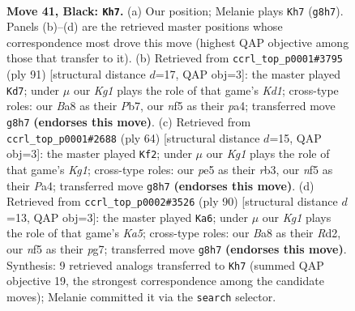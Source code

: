 \documentclass[11pt]{article}
\begin{document}
\clearpage

\begin{figure}[p]\centering
\begin{subfigure}{0.46\textwidth}\centering
\resizebox{\linewidth}{!}{%
\newchessgame
\chessboard[
  setfen={b5k1/P4p2/8/4PN1K/5p2/R6P/1r6/8 b - - 1 41},
  showmover=false,
  pgfstyle=straightmove, color=movearrow, markmove={g8-h7}
]}
\caption{}
\end{subfigure}\hfill
\begin{subfigure}{0.46\textwidth}\centering
\resizebox{\linewidth}{!}{%
\newchessgame
\chessboard[
  setfen={3k3K/1pp5/p7/4R2P/P7/8/8/6r1 b - - 17 46},
  showmover=false,
  pgfstyle=straightmove, color=movearrow, markmove={d8-d7}
]}
\caption{}
\end{subfigure}
\\[4pt]
\begin{subfigure}{0.46\textwidth}\centering
\resizebox{\linewidth}{!}{%
\newchessgame
\chessboard[
  setfen={6k1/pp6/7p/5R1P/P7/1r6/6P1/6K1 w - - 2 33},
  showmover=false,
  pgfstyle=straightmove, color=movearrow, markmove={g1-f2}
]}
\caption{}
\end{subfigure}\hfill
\begin{subfigure}{0.46\textwidth}\centering
\resizebox{\linewidth}{!}{%
\newchessgame
\chessboard[
  setfen={2k5/5ppp/8/KP4P1/7r/8/3R4/8 w - - 2 46},
  showmover=false,
  pgfstyle=straightmove, color=movearrow, markmove={a5-a6}
]}
\caption{}
\end{subfigure}
\caption{\textbf{Move 41, Black: \texttt{Kh7}.} (a) Our position; Melanie plays \texttt{Kh7} (\texttt{g8h7}). Panels (b)--(d) are the retrieved master positions whose correspondence most drove this move (highest QAP objective among those that transfer to it). (b) Retrieved from \texttt{ccrl\_top\_p0001\#3795} (ply 91) [structural distance $d$=17, QAP obj=3]: the master played \texttt{Kd7}; under $\mu$ our \emph{Kg1} plays the role of that game's \emph{Kd1}; cross-type roles: our \emph{B}a8 as their \emph{P}b7, our \emph{n}f5 as their \emph{p}a4; transferred move \texttt{g8h7} \textbf{(endorses this move)}. (c) Retrieved from \texttt{ccrl\_top\_p0001\#2688} (ply 64) [structural distance $d$=15, QAP obj=3]: the master played \texttt{Kf2}; under $\mu$ our \emph{Kg1} plays the role of that game's \emph{Kg1}; cross-type roles: our \emph{p}e5 as their \emph{r}b3, our \emph{n}f5 as their \emph{P}a4; transferred move \texttt{g8h7} \textbf{(endorses this move)}. (d) Retrieved from \texttt{ccrl\_top\_p0002\#3526} (ply 90) [structural distance $d$=13, QAP obj=3]: the master played \texttt{Ka6}; under $\mu$ our \emph{Kg1} plays the role of that game's \emph{Ka5}; cross-type roles: our \emph{B}a8 as their \emph{R}d2, our \emph{n}f5 as their \emph{p}g7; transferred move \texttt{g8h7} \textbf{(endorses this move)}. Synthesis: 9 retrieved analogs transferred to \texttt{Kh7} (summed QAP objective 19, the strongest correspondence among the candidate moves); Melanie committed it via the \texttt{search} selector.}
\label{fig:thought-m81}
\end{figure}
\end{document}
